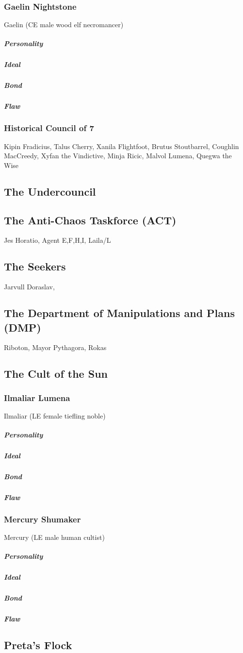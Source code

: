 \subsubsection{Gaelin Nightstone}
Gaelin (CE male wood elf necromancer)
\subparagraph{Personality}
\subparagraph{Ideal}
\subparagraph{Bond}
\subparagraph{Flaw}
\subsubsection{Historical Council of 7}
Kipin Fradicius, Talus Cherry, Xanila Flightfoot, Brutus Stoutbarrel, Coughlin MacCreedy, Xyfan the Vindictive, Minja Ricic, Malvol Lumena, Quegwa the Wise
\subsection{The Undercouncil}
\subsection{The Anti-Chaos Taskforce (ACT)}
Jes Horatio, Agent E,F,H,I, Laila/L
\subsection{The Seekers}
Jarvull Doraslav, 
\subsection{The Department of Manipulations and Plans (DMP)}
Riboton, Mayor Pythagora, Rokas
\subsection{The Cult of the Sun}
\subsubsection{Ilmaliar Lumena}
Ilmaliar (LE female tiefling noble)
\subparagraph{Personality}
\subparagraph{Ideal}
\subparagraph{Bond}
\subparagraph{Flaw}
\subsubsection{Mercury Shumaker}
Mercury (LE male human cultist)
\subparagraph{Personality}
\subparagraph{Ideal}
\subparagraph{Bond}
\subparagraph{Flaw}

\subsection{Preta's Flock}
